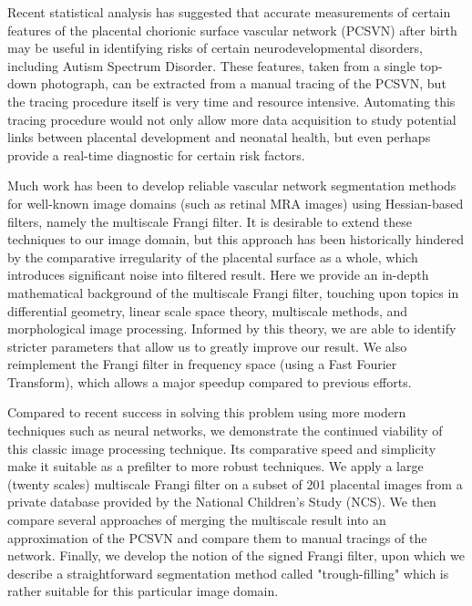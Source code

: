 

Recent statistical analysis has suggested that accurate measurements of certain features of the placental chorionic surface vascular network (PCSVN) after birth may be useful in identifying risks of certain neurodevelopmental disorders, including Autism Spectrum Disorder. These features, taken from a single top-down photograph, can be extracted from a manual tracing of the PCSVN, but the tracing procedure itself is very time and resource intensive. Automating this tracing procedure would not only allow more data acquisition to study potential links between placental development and neonatal health, but even perhaps provide a real-time diagnostic for certain risk factors.

Much work has been to develop reliable vascular network segmentation methods for well-known image domains (such as retinal MRA images) using Hessian-based filters, namely the multiscale Frangi filter. It is desirable to extend these techniques to our image domain, but this approach has been historically hindered by the comparative irregularity of the placental surface as a whole, which introduces significant noise into filtered result. Here we provide an in-depth mathematical background of the multiscale Frangi filter, touching upon topics in differential geometry, linear scale space theory, multiscale methods, and morphological image processing. Informed by this theory, we are able to identify stricter parameters that allow us to greatly improve our result. We also reimplement the Frangi filter in frequency space (using a Fast Fourier Transform), which allows a major speedup compared to previous efforts.

Compared to recent success in solving this problem using more modern techniques such as neural networks, we demonstrate the continued viability of this classic image processing technique. Its comparative speed and simplicity make it suitable as a prefilter to more robust techniques. We apply a large (twenty scales) multiscale Frangi filter on a subset of 201 placental images from a private database provided by the National Children's Study (NCS). We then compare several approaches of merging the multiscale result into an approximation of the PCSVN and compare them to manual tracings of the network. Finally, we develop the notion of the signed Frangi filter, upon which we describe a straightforward segmentation method called "trough-filling" which is rather suitable for this particular image domain.







